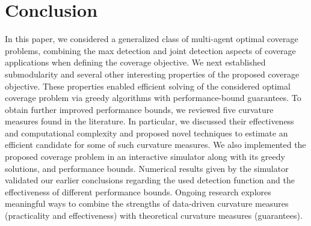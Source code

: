 \documentclass[letterpaper, 10 pt, conference]{ieeeconf}
\begin{document}
\section{Conclusion}
\label{Sec:Conclusion}

In this paper, we considered a generalized class of multi-agent optimal coverage problems, combining the max detection and joint detection aspects of coverage applications when defining the coverage objective. We next established submodularity and several other interesting properties of the proposed coverage objective. These properties enabled efficient solving of the considered optimal coverage problem via greedy algorithms with performance-bound guarantees. To obtain further improved performance bounds, we reviewed five curvature measures found in the literature. In particular, we discussed their effectiveness and computational complexity and proposed novel techniques to estimate an efficient candidate for some of such curvature measures. We also implemented the proposed coverage problem in an interactive simulator along with its greedy solutions, and performance bounds. Numerical results given by the simulator validated our earlier conclusions regarding the used detection function and the effectiveness of different performance bounds. Ongoing research explores meaningful ways to combine the strengths of data-driven curvature measures (practicality and effectiveness) with theoretical curvature measures (guarantees). 

\end{document}
